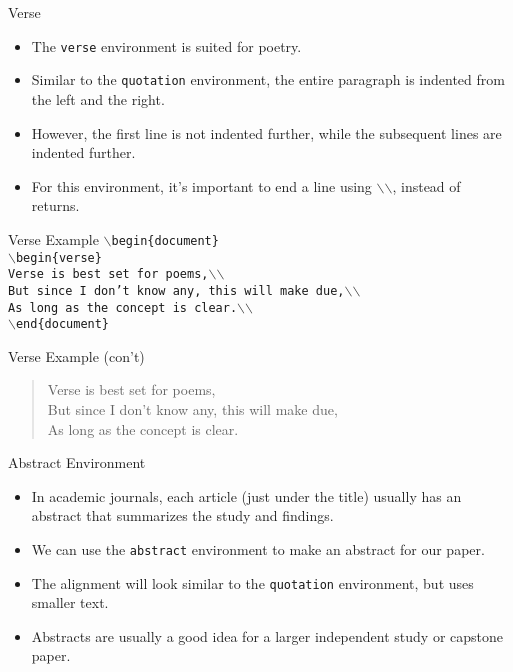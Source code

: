 \documentclass[pdf]{prosper}
\begin{document}
\begin{slide}{Verse}
	\begin{itemize}
		\item The \texttt{verse} environment is suited for poetry.
		\item Similar to the \texttt{quotation} environment, the entire paragraph is indented from the left and the right.
		\item However, the first line is not indented further, while the subsequent lines are indented further.
		\item For this environment, it's important to end a line using $\backslash$$\backslash$, instead of returns.
	\end{itemize}
\end{slide}
\begin{slide}{Verse Example}
	\texttt{$\backslash$begin\{document\}} \\
	\texttt{$\backslash$begin\{verse\}} \\
	\texttt{Verse is best set for poems,$\backslash$$\backslash$} \\
	\texttt{But since I don't know any, this will make due,$\backslash$$\backslash$} \\
	\texttt{As long as the concept is clear.$\backslash$$\backslash$} \\
	\texttt{$\backslash$end\{document\}} \\
\end{slide}
\begin{slide}{Verse Example (con't)}
	\begin{verse}
		Verse is best set for poems, \\
		But since I don't know any, this will make due, \\
		As long as the concept is clear.
	\end{verse}
\end{slide}
\begin{slide}{Abstract Environment}
	\begin{itemize}
		\item In academic journals, each article (just under the title) usually has an abstract that summarizes the study and findings.
		\item We can use the \texttt{abstract} environment to make an abstract for our paper.
		\item The alignment will look similar to the \texttt{quotation} environment, but uses smaller text.
		\item Abstracts are usually a good idea for a larger independent study or capstone paper.
	\end{itemize}
\end{slide}
\end{document}
